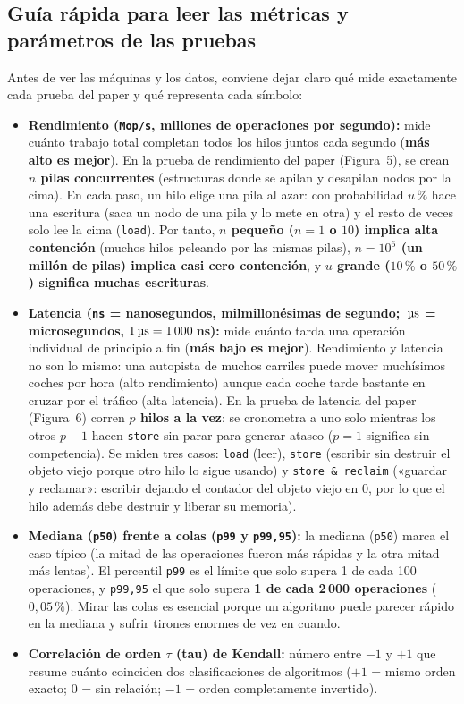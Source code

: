 \documentclass[11pt,a4paper]{article}
\newcommand{\us}{\,\text{\textmu s}}
\begin{document}
\subsection{Guía rápida para leer las métricas y parámetros de las pruebas}
Antes de ver las máquinas y los datos, conviene dejar claro qué mide exactamente cada prueba del paper y qué representa cada símbolo:

\begin{itemize}
  \item \textbf{Rendimiento (\texttt{Mop/s}, millones de operaciones por segundo):} mide cuánto trabajo total completan todos los hilos juntos cada segundo (\textbf{más alto es mejor}). En la prueba de rendimiento del paper (Figura~5), se crean \textbf{$n$ pilas concurrentes} (estructuras donde se apilan y desapilan nodos por la cima). En cada paso, un hilo elige una pila al azar: con probabilidad \textbf{$u\,\%$} hace una escritura (saca un nodo de una pila y lo mete en otra) y el resto de veces solo lee la cima (\texttt{load}). Por tanto, \textbf{$n$ pequeño ($n=1$ o $10$) implica alta contención} (muchos hilos peleando por las mismas pilas), \textbf{$n=10^6$ (un millón de pilas) implica casi cero contención}, y \textbf{$u$ grande ($10\,\%$ o $50\,\%$) significa muchas escrituras}.
  \item \textbf{Latencia (\texttt{ns} = nanosegundos, milmillonésimas de segundo; $\us{}$ = microsegundos, $1\us{} = 1\,000$\,ns):} mide cuánto tarda una operación individual de principio a fin (\textbf{más bajo es mejor}). Rendimiento y latencia no son lo mismo: una autopista de muchos carriles puede mover muchísimos coches por hora (alto rendimiento) aunque cada coche tarde bastante en cruzar por el tráfico (alta latencia). En la prueba de latencia del paper (Figura~6) corren \textbf{$p$ hilos a la vez}: se cronometra a uno solo mientras los otros $p-1$ hacen \texttt{store} sin parar para generar atasco ($p=1$ significa sin competencia). Se miden tres casos: \texttt{load} (leer), \texttt{store} (escribir sin destruir el objeto viejo porque otro hilo lo sigue usando) y \texttt{store \& reclaim} («guardar y reclamar»: escribir dejando el contador del objeto viejo en 0, por lo que el hilo además debe destruir y liberar su memoria).
  \item \textbf{Mediana (\texttt{p50}) frente a colas (\texttt{p99} y \texttt{p99,95}):} la mediana (\texttt{p50}) marca el caso típico (la mitad de las operaciones fueron más rápidas y la otra mitad más lentas). El percentil \texttt{p99} es el límite que solo supera 1 de cada 100 operaciones, y \texttt{p99,95} el que solo supera \textbf{1 de cada 2\,000 operaciones} ($0,05\,\%$). Mirar las colas es esencial porque un algoritmo puede parecer rápido en la mediana y sufrir tirones enormes de vez en cuando.
  \item \textbf{Correlación de orden $\tau$ (tau) de Kendall:} número entre $-1$ y $+1$ que resume cuánto coinciden dos clasificaciones de algoritmos ($+1$ = mismo orden exacto; $0$ = sin relación; $-1$ = orden completamente invertido).
\end{itemize}
\end{document}
